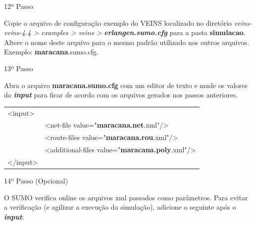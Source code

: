 \documentclass[
12pt,				%
openright,			%
oneside,			%
a4paper,			%
brazil,				%
]{abntex2}
\begin{document}
{\begin{anexosenv}
            	\begin{description}
                    \item[12º Passo]
                \end{description}
                \par Copie o arquivo de configuração exemplo do VEINS localizado no diretório \textit{veins-veins-4.4 > examples > veins > \textbf{erlangen.sumo.cfg}} para a pasta \textbf{simulacao}. Altere o nome deste arquivo para o mesmo padrão utilizado nos outros arquivos. Exemplo: \textbf{maracana}.sumo.cfg.
        	

            	\begin{description}
                    \item[13º Passo]
                \end{description}
                \par Abra o arquivo \textbf{maracana.sumo.cfg} com um editor de texto e mude os valores do \textbf{\textit{input}} para ficar de acordo com os arquivos gerados nos passos anteriores.
		
	            \begin{table}[H]
		            \renewcommand{\arraystretch}{1}
	                \begin{tabular}{|lp{13.3cm}|}
		                \hline
                        <input>     & \\
                                    & <net-file value="\textbf{maracana.net}.xml"/> \\
                                    & <route-files value="\textbf{maracana.rou}.xml"/> \\
                                    & <additional-files value="\textbf{maracana.poly}.xml"/> \\
                        </input>    & \\
		                \hline
		            \end{tabular}
	            \end{table}
        	

            	\begin{description}
                    \item[14º Passo (Opcional)]
                \end{description}
                \par O SUMO verifica online os arquivos xml passados como parâmetros. Para evitar a verificação (e agilizar a execução da simulação), adicione o seguinte após o \textit{\textbf{input}}:
		

\end{anexosenv}}
\end{document}

